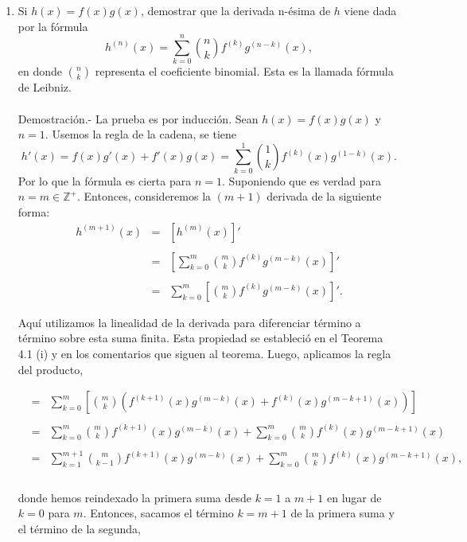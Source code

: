 \begin{enumerate}[\bfseries 1.]
    \item Si $h(x)=f(x)g(x)$, demostrar que la derivada n-ésima de $h$ viene dada por la fórmula
    $$h^{(n)}(x)=\sum_{k=0}^n {n\choose k}f^{(k)}g^{(n-k)}(x),$$
    en donde ${n\choose k}$ representa el coeficiente binomial. Esta es la llamada fórmula de Leibniz.\\\\
	Demostración.-\; La prueba es por inducción. Sean $h(x)=f(x)g(x)$ y $n=1$. Usemos la regla de la cadena, se tiene
	$$h'(x)=f(x)g'(x)+f'(x)g(x)=\sum_{k=0}^1 {1\choose k}f^{(k)}(x)g^{(1-k)}(x).$$
	Por lo que la fórmula es cierta para $n=1$. Suponiendo que es verdad para $n=m\in \mathbb{Z}^+$. Entonces, consideremos la $(m+1)$ derivada de la siguiente forma:
	$$
	\begin{array}{rcl}
	    h^{(m+1)}(x) &=& \left[h^{(m)}(x)\right]'\\\\
			 &=& \left[\displaystyle\sum_{k=0}^m {m\choose k}f^{(k)}g^{(m-k)}(x)\right]'\\\\
			 &=& \displaystyle\sum_{k=0}^m \left[{m\choose k}f^{(k)}g^{(m-k)}(x)\right]'.
	\end{array}
	$$

	Aquí utilizamos la linealidad de la derivada para diferenciar término a término sobre esta suma finita. Esta propiedad se estableció en el Teorema 4.1 (i) y en los comentarios que siguen al teorema. Luego, aplicamos la regla del producto,

	$$
	\begin{array}{rcl}
	    &=& \displaystyle\sum_{k=0}^m \left[{m\choose k}\left(f^{(k+1)}(x)g^{(m-k)}(x)+f^{(k)}(x)g^{(m-k+1)}(x)\right)\right]\\\\
	    &=& \displaystyle\sum_{k=0}^m {m\choose k} f^{(k+1)}(x)g^{(m-k)}(x)+\sum_{k=0}^m {m\choose k} f^{(k)}(x)g^{(m-k+1)}(x)\\\\
	    &=& \displaystyle\sum_{k=1}^{m+1} {m\choose k-1} f^{(k+1)}(x)g^{(m-k)}(x)+\sum_{k=0}^m {m\choose k} f^{(k)}(x)g^{(m-k+1)}(x),\\\\
	\end{array}
	$$

	donde hemos reindexado la primera suma desde $k=1$ a $m+1$ en lugar de $k=0$ para $m$. Entonces, sacamos el término $k=m+1$ de la primera suma y el término de la segunda,


\end{enumerate}
